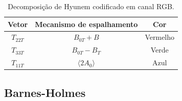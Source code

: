 \documentclass{article}
\begin{document}
\begin{table}[H]
    \centering
    \begin{tabular}{|c|c|c|}
         \hline
         Vetor & Mecanismo de espalhamento & Cor \\ \hline
         $T_{22T}$ & $B_{0T} + B$ & Vermelho \\ \hline
         $T_{33T}$ & $B_{0T} - B_{T}$ & Verde \\ \hline
         $T_{11T}$ & $\langle2A_{0}\rangle$ & Azul \\ \hline
    \end{tabular}
    \caption{Decomposição de Hyunem codificado em canal RGB.}
    \label{tab:code_color_hyunem}
\end{table}


\subsection{\textbf{Barnes-Holmes}}
\end{document}
